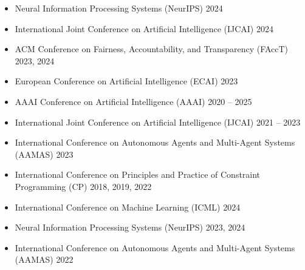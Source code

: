 

\begin{itemize}
  \item Neural Information Processing Systems (NeurIPS)  \hfill {2024}
  \item International Joint Conference on Artificial Intelligence (IJCAI) \hfill {2024}
  \item ACM Conference on Fairness, Accountability, and Transparency (FAccT) \hfill {2023, 2024}
  \item European Conference on Artificial Intelligence (ECAI) \hfill {2023}
\end{itemize}

\begin{itemize}
  \item AAAI Conference on Artificial Intelligence (AAAI) \hfill {2020 -- 2025}

  \item International Joint Conference on Artificial Intelligence (IJCAI) \hfill {2021 -- 2023}

  \item International Conference on Autonomous Agents and Multi-Agent Systems (AAMAS) \hfill {2023}

  \item International Conference on Principles and Practice of Constraint Programming (CP) \hfill{2018, 2019, 2022} 
\end{itemize}

\begin{itemize}
  \item International Conference on Machine Learning (ICML) \hfill 2024

  \item Neural Information Processing Systems (NeurIPS)  \hfill {2023, 2024}

  \item International Conference on Autonomous Agents and Multi-Agent Systems (AAMAS) \hfill {2022}
\end{itemize}


